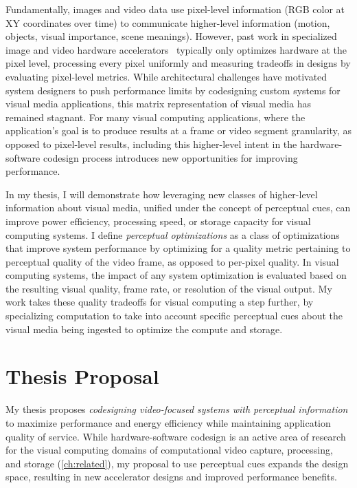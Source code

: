 Fundamentally, images and video data use pixel-level information (RGB color at XY coordinates over time) to communicate higher-level information (motion, objects, visual importance, scene meanings).
However, past work in specialized image and video hardware accelerators~\cite{hauswald2014hybrid, convolution_engine, adams2010frankencamera} typically only optimizes hardware at the pixel level, processing every pixel uniformly and measuring tradeoffs in designs by evaluating pixel-level metrics.
While architectural challenges have motivated system designers to push performance limits by codesigning custom systems for visual media applications, this matrix representation of visual media has remained stagnant.
For many visual computing applications, where the application's goal is to produce results at a frame or video segment granularity, as opposed to pixel-level results, including this higher-level intent in the hardware-software codesign process introduces new opportunities for improving performance.

In my thesis, I will demonstrate how leveraging new classes of higher-level information about visual media, unified under the concept of perceptual cues, can improve power efficiency, processing speed, or storage capacity for visual computing systems.
I define \textit{perceptual optimizations} as a class of optimizations that improve system performance by optimizing for a quality metric pertaining to perceptual quality of the video frame, as opposed to per-pixel quality.
In visual computing systems, the impact of any system optimization is evaluated based on the resulting visual quality, frame rate, or resolution of the visual output.
My work takes these quality tradeoffs for visual computing a step further, by specializing computation to take into account specific perceptual cues about the visual media being ingested to optimize the compute and storage.

\section{Thesis Proposal}
My thesis proposes \emph{codesigning video-focused systems with perceptual information} to maximize performance and energy efficiency while maintaining application quality of service.
While hardware-software codesign is an active area of research for the visual computing domains of computational video capture, processing, and storage (\ref{ch:related}), my proposal to use perceptual cues expands the design space, resulting in new accelerator designs and improved performance benefits.

